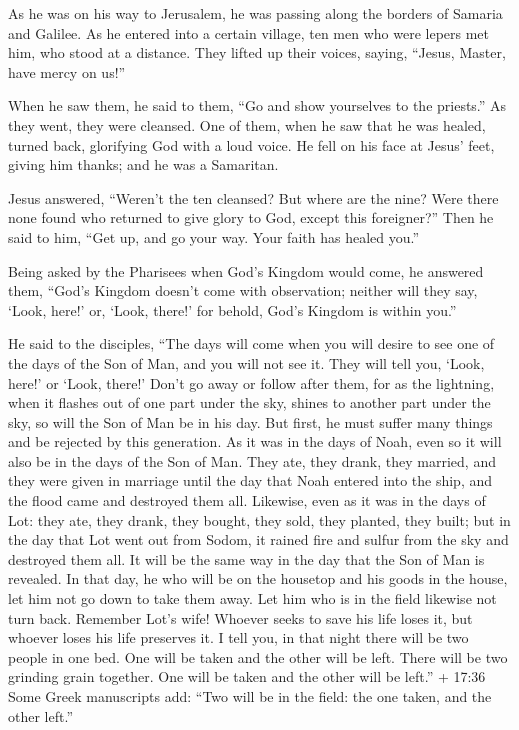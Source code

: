  As he was on his way to Jerusalem, he was passing along
the borders of Samaria and Galilee.  As he entered into a
certain village, ten men who were lepers met him, who stood at a
distance.  They lifted up their voices, saying, ``Jesus,
Master, have mercy on us!''

 When he saw them, he said to them, ``Go and show
yourselves to the priests.'' As they went, they were cleansed.
 One of them, when he saw that he was healed, turned back,
glorifying God with a loud voice.  He fell on his face at
Jesus' feet, giving him thanks; and he was a Samaritan.

 Jesus answered, ``Weren't the ten cleansed? But where are
the nine?  Were there none found who returned to give glory
to God, except this foreigner?''  Then he said to him,
``Get up, and go your way. Your faith has healed you.''

 Being asked by the Pharisees when God's Kingdom would
come, he answered them, ``God's Kingdom doesn't come with observation;
 neither will they say, `Look, here!' or, `Look, there!'
for behold, God's Kingdom is within you.''

 He said to the disciples, ``The days will come when you
will desire to see one of the days of the Son of Man, and you will not
see it.  They will tell you, `Look, here!' or `Look,
there!' Don't go away or follow after them,  for as the
lightning, when it flashes out of one part under the sky, shines to
another part under the sky, so will the Son of Man be in his day.
 But first, he must suffer many things and be rejected by
this generation.  As it was in the days of Noah, even so it
will also be in the days of the Son of Man.  They ate, they
drank, they married, and they were given in marriage until the day that
Noah entered into the ship, and the flood came and destroyed them all.
 Likewise, even as it was in the days of Lot: they ate,
they drank, they bought, they sold, they planted, they built;
 but in the day that Lot went out from Sodom, it rained
fire and sulfur from the sky and destroyed them all.  It
will be the same way in the day that the Son of Man is revealed.
 In that day, he who will be on the housetop and his goods
in the house, let him not go down to take them away. Let him who is in
the field likewise not turn back.  Remember Lot's wife!
 Whoever seeks to save his life loses it, but whoever loses
his life preserves it.  I tell you, in that night there
will be two people in one bed. One will be taken and the other will be
left.  There will be two grinding grain together. One will
be taken and the other will be left.''  + 17:36 Some Greek
manuscripts add: ``Two will be in the field: the one taken, and the
other left.''

